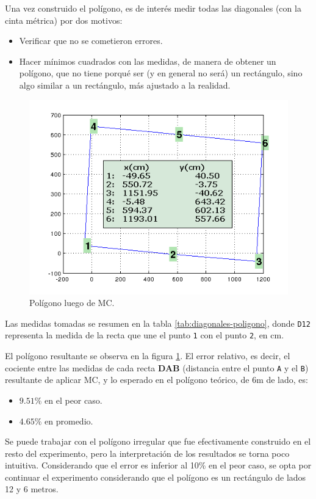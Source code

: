 \documentclass[main]{subfiles}
\begin{document}
Una vez construido el polígono, es de interés medir todas las diagonales (con la cinta métrica) por dos motivos:
\begin{itemize}
\item Verificar que no se cometieron errores.
\item Hacer mínimos cuadrados con las medidas, de manera de obtener un polígono, que no tiene porqué ser (y en general no será) un rectángulo, sino algo similar a un rectángulo, más ajustado a la realidad.
\end{itemize}

\begin{figure}
\vspace{-20pt}
  \includegraphics[width=.5\textwidth]{./pics_gps/pol_mc.png}
\caption{Polígono luego de MC.}
\label{fig:pol_mc.png}
\vspace{-30pt}
\end{figure}
Las medidas tomadas se resumen en la tabla \ref{tab:diagonales-poligono}, donde \verb+D12+ representa la medida de la recta que une el punto \verb+1+ con el punto \verb+2+, en cm.

El polígono resultante se observa en la figura \ref{fig:pol_mc.png}. El error relativo, es decir, el cociente entre las medidas de cada recta \textbf{DAB} (distancia entre el punto \verb+A+ y el \verb+B+) resultante de aplicar MC, y lo esperado en el polígono teórico, de 6m de lado, es:

\begin{itemize}
\item $9.51\%$ en el peor caso.
\item $4.65\%$ en promedio.
\end{itemize}

Se puede trabajar con el pol\'igono irregular que fue efectivamente construido en el resto del experimento, pero la interpretación de los resultados se torna poco intuitiva. Considerando que el error es inferior al 10\% en el peor caso, se opta por continuar el experimento considerando que el pol\'igono es un rect\'angulo de lados 12 y 6 metros.
\end{document}
